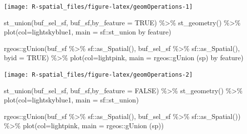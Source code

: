 \documentclass[
  11pt,
]{book}
\newenvironment{Shaded}{\begin{snugshade}}{\end{snugshade}}
\newcommand{\AttributeTok}[1]{\textcolor[rgb]{0.77,0.63,0.00}{#1}}
\newcommand{\ConstantTok}[1]{\textcolor[rgb]{0.00,0.00,0.00}{#1}}
\newcommand{\FunctionTok}[1]{\textcolor[rgb]{0.00,0.00,0.00}{#1}}
\newcommand{\NormalTok}[1]{#1}
\newcommand{\SpecialCharTok}[1]{\textcolor[rgb]{0.00,0.00,0.00}{#1}}
\newcommand{\StringTok}[1]{\textcolor[rgb]{0.31,0.60,0.02}{#1}}
\begin{document}
\texttt{[image: R-spatial\_files/figure-latex/geomOperations-1]}

\begin{Shaded}
\begin{Highlighting}[]
\FunctionTok{st\_union}\NormalTok{(buf\_sel\_sf, buf\_sf,}\AttributeTok{by\_feature =} \ConstantTok{TRUE}\NormalTok{) }\SpecialCharTok{\%\textgreater{}\%} 
  \FunctionTok{st\_geometry}\NormalTok{() }\SpecialCharTok{\%\textgreater{}\%} 
  \FunctionTok{plot}\NormalTok{(}\AttributeTok{col=}\StringTok{\textquotesingle{}lightskyblue1\textquotesingle{}}\NormalTok{, }\AttributeTok{main =} \StringTok{\textquotesingle{}sf::st\_union by feature\textquotesingle{}}\NormalTok{)}

\NormalTok{rgeos}\SpecialCharTok{::}\FunctionTok{gUnion}\NormalTok{(buf\_sf }\SpecialCharTok{\%\textgreater{}\%}\NormalTok{ sf}\SpecialCharTok{::}\FunctionTok{as\_Spatial}\NormalTok{(), }
\NormalTok{              buf\_sel\_sf }\SpecialCharTok{\%\textgreater{}\%}\NormalTok{ sf}\SpecialCharTok{::}\FunctionTok{as\_Spatial}\NormalTok{(), }
              \AttributeTok{byid =} \ConstantTok{TRUE}\NormalTok{) }\SpecialCharTok{\%\textgreater{}\%} 
  \FunctionTok{plot}\NormalTok{(}\AttributeTok{col=}\StringTok{\textquotesingle{}lightpink\textquotesingle{}}\NormalTok{, }\AttributeTok{main =} \StringTok{\textquotesingle{}rgeos::gUnion (sp) by feature\textquotesingle{}}\NormalTok{)}
\end{Highlighting}
\end{Shaded}

\texttt{[image: R-spatial\_files/figure-latex/geomOperations-2]}

\begin{Shaded}
\begin{Highlighting}[]
\FunctionTok{st\_union}\NormalTok{(buf\_sel\_sf, buf\_sf,}\AttributeTok{by\_feature =} \ConstantTok{FALSE}\NormalTok{) }\SpecialCharTok{\%\textgreater{}\%} 
  \FunctionTok{st\_geometry}\NormalTok{() }\SpecialCharTok{\%\textgreater{}\%} 
  \FunctionTok{plot}\NormalTok{(}\AttributeTok{col=}\StringTok{\textquotesingle{}lightskyblue1\textquotesingle{}}\NormalTok{, }\AttributeTok{main =} \StringTok{\textquotesingle{}sf::st\_union\textquotesingle{}}\NormalTok{)}

\NormalTok{rgeos}\SpecialCharTok{::}\FunctionTok{gUnion}\NormalTok{(buf\_sf }\SpecialCharTok{\%\textgreater{}\%}\NormalTok{ sf}\SpecialCharTok{::}\FunctionTok{as\_Spatial}\NormalTok{(), }
\NormalTok{              buf\_sel\_sf }\SpecialCharTok{\%\textgreater{}\%}\NormalTok{ sf}\SpecialCharTok{::}\FunctionTok{as\_Spatial}\NormalTok{()) }\SpecialCharTok{\%\textgreater{}\%} 
  \FunctionTok{plot}\NormalTok{(}\AttributeTok{col=}\StringTok{\textquotesingle{}lightpink\textquotesingle{}}\NormalTok{, }\AttributeTok{main =} \StringTok{\textquotesingle{}rgeos::gUnion (sp)\textquotesingle{}}\NormalTok{)}
\end{Highlighting}
\end{Shaded}
\end{document}

